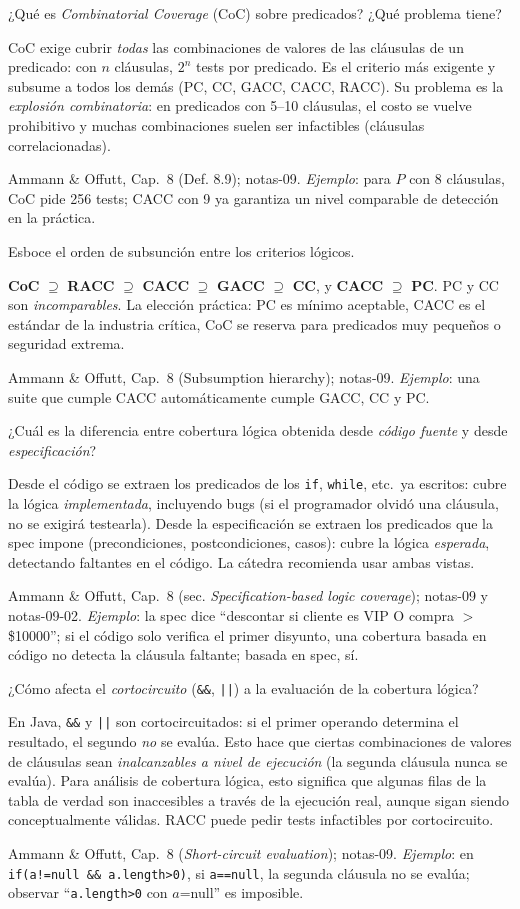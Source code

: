 \documentclass[11pt,a4paper]{article}
\newcounter{preg}
\newcommand{\qa}[3]{%
  \stepcounter{preg}%
  \vspace{0.4em}
  \begin{preguntabox}{\thepreg}
  #1
  \end{preguntabox}
  \begin{respuestabox}
  #2
  \end{respuestabox}
  \begin{refbox}
  #3
  \end{refbox}
  \vspace{0.6em}
}
\begin{document}
\qa{¿Qué es \emph{Combinatorial Coverage} (CoC) sobre predicados? ¿Qué problema tiene?}
{CoC exige cubrir \emph{todas} las combinaciones de valores de las cláusulas de un predicado: con $n$ cláusulas, $2^n$ tests por predicado. Es el criterio más exigente y subsume a todos los demás (PC, CC, GACC, CACC, RACC). Su problema es la \emph{explosión combinatoria}: en predicados con 5--10 cláusulas, el costo se vuelve prohibitivo y muchas combinaciones suelen ser infactibles (cláusulas correlacionadas).}
{Ammann \& Offutt, Cap.~8 (Def. 8.9); notas-09. \emph{Ejemplo}: para $P$ con 8 cláusulas, CoC pide 256 tests; CACC con 9 ya garantiza un nivel comparable de detección en la práctica.}

\qa{Esboce el orden de subsunción entre los criterios lógicos.}
{\textbf{CoC} $\supseteq$ \textbf{RACC} $\supseteq$ \textbf{CACC} $\supseteq$ \textbf{GACC} $\supseteq$ \textbf{CC}, y \textbf{CACC} $\supseteq$ \textbf{PC}. PC y CC son \emph{incomparables}. La elección práctica: PC es mínimo aceptable, CACC es el estándar de la industria crítica, CoC se reserva para predicados muy pequeños o seguridad extrema.}
{Ammann \& Offutt, Cap.~8 (Subsumption hierarchy); notas-09. \emph{Ejemplo}: una suite que cumple CACC automáticamente cumple GACC, CC y PC.}

\qa{¿Cuál es la diferencia entre cobertura lógica obtenida desde \emph{código fuente} y desde \emph{especificación}?}
{Desde el código se extraen los predicados de los \texttt{if}, \texttt{while}, etc.\ ya escritos: cubre la lógica \emph{implementada}, incluyendo bugs (si el programador olvidó una cláusula, no se exigirá testearla). Desde la especificación se extraen los predicados que la spec impone (precondiciones, postcondiciones, casos): cubre la lógica \emph{esperada}, detectando faltantes en el código. La cátedra recomienda usar ambas vistas.}
{Ammann \& Offutt, Cap.~8 (sec. \emph{Specification-based logic coverage}); notas-09 y notas-09-02. \emph{Ejemplo}: la spec dice ``descontar si cliente es VIP O compra $>$ \$10000''; si el código solo verifica el primer disyunto, una cobertura basada en código no detecta la cláusula faltante; basada en spec, sí.}

\qa{¿Cómo afecta el \emph{cortocircuito} (\texttt{\&\&}, \texttt{||}) a la evaluación de la cobertura lógica?}
{En Java, \texttt{\&\&} y \texttt{||} son cortocircuitados: si el primer operando determina el resultado, el segundo \emph{no} se evalúa. Esto hace que ciertas combinaciones de valores de cláusulas sean \emph{inalcanzables a nivel de ejecución} (la segunda cláusula nunca se evalúa). Para análisis de cobertura lógica, esto significa que algunas filas de la tabla de verdad son inaccesibles a través de la ejecución real, aunque sigan siendo conceptualmente válidas. RACC puede pedir tests infactibles por cortocircuito.}
{Ammann \& Offutt, Cap.~8 (\emph{Short-circuit evaluation}); notas-09. \emph{Ejemplo}: en \texttt{if(a!=null \&\& a.length>0)}, si \texttt{a==null}, la segunda cláusula no se evalúa; observar ``\texttt{a.length>0} con $a$=null'' es imposible.}
\end{document}
